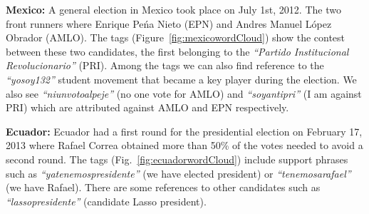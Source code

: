 \noindent	
{\bf Mexico:} A general election in Mexico took place on July 1st, 2012.
The two front runners where Enrique Pe\'{n}a Nieto (EPN) and Andres Manuel L\'{o}pez Obrador (AMLO).
The tags (Figure~\ref{fig:mexicowordCloud}) show the contest between these two candidates, the first belonging to the \emph{“Partido Institucional Revolucionario”} (PRI). 
Among the tags we can also find reference to the \emph{“yosoy132”} student movement that became a key player during the election. 
We also see \emph{“niunvotoalpeje”} (no one vote for AMLO) and \emph{“soyantipri”} (I am against PRI) which are attributed against AMLO and EPN respectively.

\noindent
{\bf Ecuador:}
Ecuador had a first round for the presidential election on February 17, 2013 where Rafael Correa obtained more than 50\% of the votes needed to avoid a second round. 
The tags (Fig.~\ref{fig:ecuadorwordCloud}) include support phrases such as \emph{“yatenemospresidente”} (we have elected president) or \emph{“tenemosarafael”} (we have Rafael). 
There are some references to other candidates such as \emph{“lassopresidente”} (candidate Lasso president).

